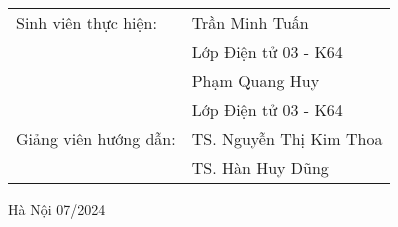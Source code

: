 \begin{titlepage}
\begin{center}
  \begin{table}[H]%
       \centering
       \begin{tabular}{l l}
            \fontsize{14pt}{0pt}\selectfont Sinh viên thực hiện:      & \fontsize{14pt}{0pt}\selectfont Trần Minh Tuấn\\
              &\fontsize{14pt}{0pt}\selectfont Lớp Điện tử 03 - K64  \vspace{6pt} \\
              &\fontsize{14pt}{0pt}\selectfont Phạm Quang Huy  \\
              &\fontsize{14pt}{0pt}\selectfont Lớp Điện tử 03 - K64 \vspace{6pt} \\
            \fontsize{14pt}{0pt}\selectfont Giảng viên hướng dẫn: & \fontsize{14pt}{0pt}\selectfont TS. Nguyễn Thị Kim Thoa \\   
              &\fontsize{14pt}{0pt}\selectfont TS. Hàn Huy Dũng \vspace{6pt} \\
       \end{tabular}
  \end{table}
  \vspace{1.3cm} %
  \fontsize{14pt}{0pt}\selectfont Hà Nội 07/2024
  \end{center}
  \end{titlepage}
  
